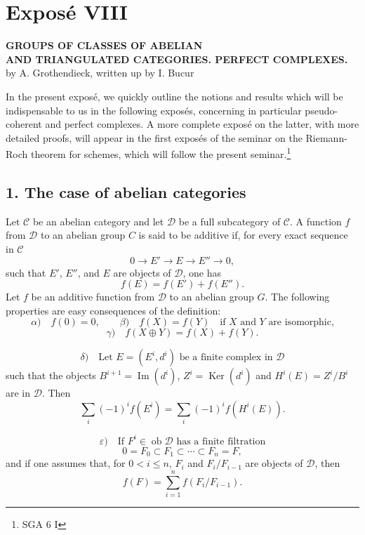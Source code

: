 \documentclass[11pt]{article}
\providecommand{\Ob}{\operatorname{ob}}
\providecommand{\cC}{\mathcal C}
\providecommand{\Ob}{\operatorname{ob}}
\providecommand{\cC}{\mathcal C}
\providecommand{\cD}{\mathcal D}
\providecommand{\Ob}{\operatorname{Ob}}
\providecommand{\Ob}{\operatorname{ob}}
\providecommand{\Ob}{\operatorname{Ob}}
\begin{document}
\newpage
{}
\section*{Exposé VIII}

\begin{center}
\textbf{GROUPS OF CLASSES OF ABELIAN}\\
\textbf{AND TRIANGULATED CATEGORIES. PERFECT COMPLEXES.}\\[1ex]
by A. Grothendieck, written up by I. Bucur
\end{center}

In the present exposé, we quickly outline the notions and results which will be indispensable to us in the following exposés, concerning in particular pseudo-coherent and perfect complexes. A more complete exposé on the latter, with more detailed proofs, will appear in the first exposés of the seminar on the Riemann-Roch theorem for schemes, which will follow the present seminar.\footnote{SGA 6 I}

\subsection*{1. The case of abelian categories}

Let $\cC$ be an abelian category and let $\cD$ be a full subcategory of $\cC$. A function $f$ from $\cD$ to an abelian group $C$ is said to be additive if, for every exact sequence in $\cC$
\[
0\longrightarrow E'\longrightarrow E\longrightarrow E''\longrightarrow 0,
\]
such that $E'$, $E''$, and $E$ are objects of $\cD$, one has
\[
f(E)=f(E')+f(E'').
\]
Let $f$ be an additive function from $\cD$ to an abelian group $G$. The following properties are easy consequences of the definition:
\[
\alpha)\quad f(0)=0,\qquad
\beta)\quad f(X)=f(Y)\quad\text{if }X\text{ and }Y\text{ are isomorphic,}
\]
\[
\gamma)\quad f(X\oplus Y)=f(X)+f(Y).
\]

\[
\delta)\quad
\text{Let }E=(E^i,d^i)\text{ be a finite complex in }\cD
\]
such that the objects $B^{i+1}=\operatorname{Im}(d^i)$, $Z^i=\operatorname{Ker}(d^i)$ and $H^i(E)=Z^i/B^i$ are in $\cD$. Then
\[
\sum_i (-1)^i f(E^i)=\sum_i (-1)^i f(H^i(E)).
\]

\[
\varepsilon)\quad
\text{If }F^i\in\Ob \cD\text{ has a finite filtration}
\]
\[
0=F_0\subset F_1\subset\cdots\subset F_n=F,
\]
and if one assumes that, for $0<i\le n$, $F_i$ and $F_i/F_{i-1}$ are objects of $\cD$, then
\[
f(F)=\sum_{i=1}^n f(F_i/F_{i-1}).
\]
\end{document}
